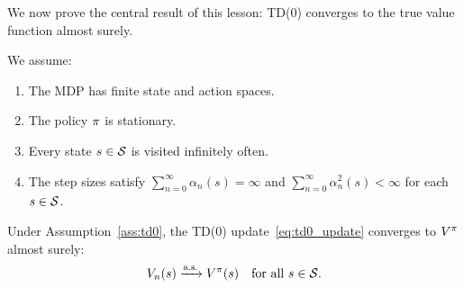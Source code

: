 \documentclass[11pt,a4paper]{article}
\begin{document}
We now prove the central result of this lesson: TD(0) converges to the
true value function almost surely.

\begin{assumption}
\label{ass:td0}
We assume:
\begin{enumerate}[nosep]
  \item The MDP has finite state and action spaces.
  \item The policy $\pi$ is stationary.
  \item Every state $s \in \mathcal{S}$ is visited infinitely often.
  \item The step sizes satisfy $\sum_{n=0}^\infty \alpha_n(s) = \infty$
    and $\sum_{n=0}^\infty \alpha_n^2(s) < \infty$ for each
    $s \in \mathcal{S}$.
\end{enumerate}
\end{assumption}

\begin{keyresult}[title={Convergence of TD(0)}]
\begin{theorem}[Convergence of TD(0)]
\label{thm:td0_convergence}
Under Assumption~\ref{ass:td0}, the TD(0)
update~\eqref{eq:td0_update} converges to $V^{\pi}$ almost surely:
\begin{equation}
  V_n(s) \xrightarrow{\text{a.s.}} V^{\pi}(s) \quad \text{for all } s \in \mathcal{S}.
\end{equation}
\end{theorem}
\end{keyresult}
\end{document}
